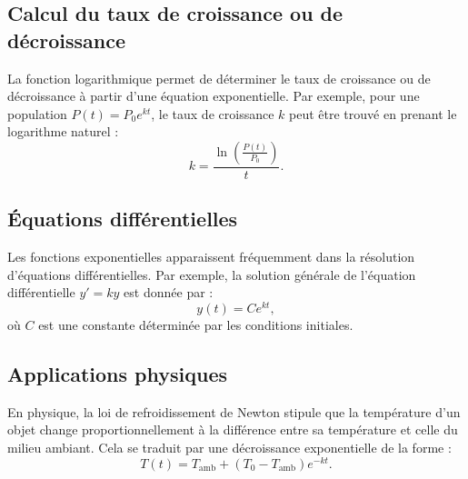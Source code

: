 \documentclass{article}
\begin{document}
	\subsection{Calcul du taux de croissance ou de décroissance}
	
	La fonction logarithmique permet de déterminer le taux de croissance ou de décroissance à partir d'une équation exponentielle. Par exemple, pour une population \( P(t) = P_0 e^{kt} \), le taux de croissance \( k \) peut être trouvé en prenant le logarithme naturel :
	\[
	k = \frac{\ln\left( \frac{P(t)}{P_0} \right)}{t}.
	\]
	
	\subsection{Équations différentielles}
	
	Les fonctions exponentielles apparaissent fréquemment dans la résolution d'équations différentielles. Par exemple, la solution générale de l'équation différentielle \( y' = ky \) est donnée par :
	\[
	y(t) = C e^{kt},
	\]
	où \( C \) est une constante déterminée par les conditions initiales.
	
	\subsection{Applications physiques}
	
	En physique, la loi de refroidissement de Newton stipule que la température d'un objet change proportionnellement à la différence entre sa température et celle du milieu ambiant. Cela se traduit par une décroissance exponentielle de la forme :
	\[
	T(t) = T_{\text{amb}} + (T_0 - T_{\text{amb}}) e^{-kt}.
	\]
	
	
	
\end{document}
